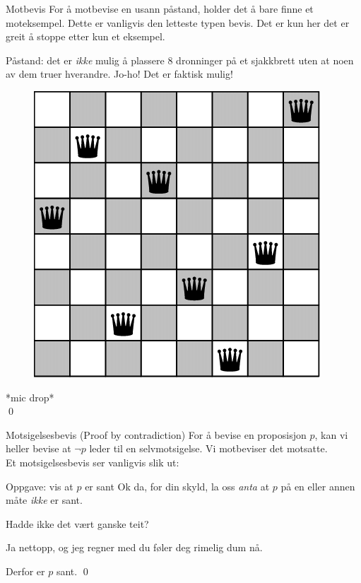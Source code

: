 \begin{frame}{Motbevis}
    For å motbevise en usann påstand, holder det å bare finne et moteksempel. Dette er vanligvis den letteste typen bevis. Det er kun her det er greit å stoppe etter kun et eksempel.
    \pause
    \begin{block}{Påstand: det er \emph{ikke} mulig å plassere 8 dronninger på et sjakkbrett uten at noen av dem truer hverandre.}
        \pause
        \centering
        Jo-ho! Det er faktisk mulig!
        \begin{figure}
            \includegraphics[scale=0.20]{images/8 queens.png}
            \label{fig:my_label}
        \end{figure}
        \pause
        \centering
        *mic drop*\\
        \qed
    \end{block}
\end{frame}

\begin{frame}{Motsigelsesbevis (Proof by contradiction)}
    For å bevise en proposisjon $p$, kan vi heller bevise at $\lnot p$ leder til en selvmotsigelse. 
    Vi motbeviser det motsatte.\\

    \pause
    Et motsigelsesbevis ser vanligvis slik ut:
    \begin{block}{Oppgave: vis at $p$ er sant}
        \pause
        Ok da, for din skyld, la oss \emph{anta} at $p$ på en eller annen måte \emph{ikke} er sant.

        \pause
        Hadde ikke det vært ganske teit?

        \pause
        Ja nettopp, og jeg regner med du føler deg rimelig dum nå.

        \pause
        Derfor er $p$ sant. \qed
    \end{block}
\end{frame}

